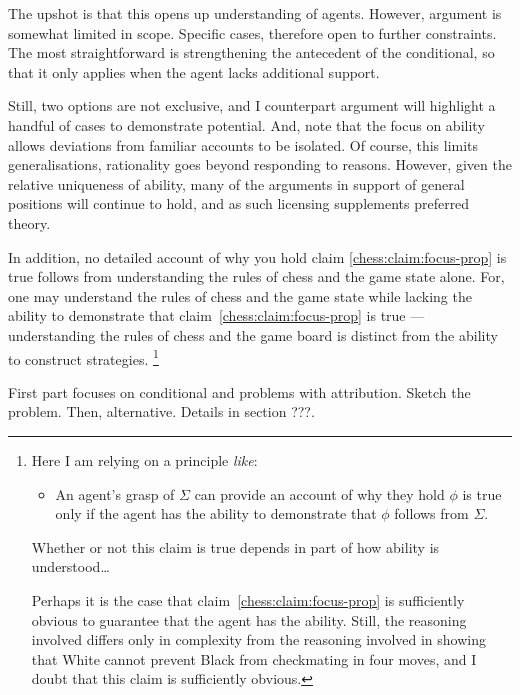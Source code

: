 \documentclass[10pt]{article}
\begin{document}
\begin{note}
  The upshot is that this opens up understanding of agents.
  However, argument is somewhat limited in scope.
  Specific cases, therefore open to further constraints.
  The most straightforward is strengthening the antecedent of the conditional, so that it only applies when the agent lacks additional support.

  Still, two options are not exclusive, and I counterpart argument will highlight a handful of cases to demonstrate potential.
  And, note that the focus on ability allows deviations from familiar accounts to be isolated.
  Of course, this limits generalisations, rationality goes beyond responding to reasons.
  However, given the relative uniqueness of ability, many of the arguments in support of general positions will continue to hold, and as such licensing supplements preferred theory.
\end{note}

\begin{note}
In addition, no detailed account of why you hold claim \ref{chess:claim:focus-prop} is true follows from understanding the rules of chess and the game state alone.
For, one may understand the rules of chess and the game state while lacking the ability to demonstrate that claim~\ref{chess:claim:focus-prop} is true --- understanding the rules of chess and the game board is distinct from the ability to construct strategies.\nolinebreak
\footnote{
  Here I am relying on a principle \emph{like}:
  \begin{itemize}
  \item An agent's grasp of \(\Sigma\) can provide an account of why they hold \(\phi\) is true only if the agent has the ability to demonstrate that \(\phi\) follows from \(\Sigma\).
  \end{itemize}
  {
    \color{red}
    Whether or not this claim is true depends in part of how ability is understood\dots
  }

  Perhaps it is the case that claim~\ref{chess:claim:focus-prop} is sufficiently obvious to guarantee that the agent has the ability.
  Still, the reasoning involved differs only in complexity from the reasoning involved in showing that White cannot prevent Black from checkmating in four moves, and I doubt that this claim is sufficiently obvious.
}
\end{note}

\begin{note}
  First part focuses on conditional and problems with attribution.
  Sketch the problem.
  Then, alternative.
  Details in {\color{red} section ???}.
  
\end{note}
\end{document}
